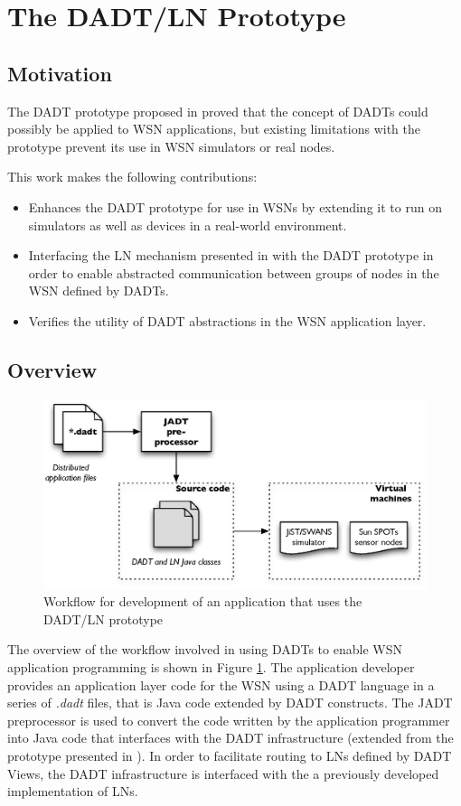 \section{The DADT/LN Prototype}

\subsection{Motivation}

The DADT prototype proposed in \cite{migliavacca_DADT:2006} proved that the
concept of DADTs could possibly be applied to WSN
applications, but existing limitations with the prototype prevent its use in WSN simulators or real nodes.

This work makes the following contributions:

\begin{itemize}
  \item Enhances the DADT prototype for use in WSNs by extending it to run
  on simulators as well as devices in a real-world environment.
  \item Interfacing the LN mechanism presented in \cite{mottola_LNAbstraction} with the DADT prototype in order
  to enable abstracted communication between groups of nodes in the WSN defined
  by DADTs.
  \item  Verifies the utility of DADT abstractions in the WSN
  application layer.
\end{itemize}

\subsection{Overview}
\begin{figure}
\centering
\includegraphics[width=\textwidth]{img/DADTLN_workflow.eps} 
\caption[DADT/LN application workflow]{Workflow for development of an application that uses
the DADT/LN prototype}
\label{Fig:DADTLN_workflow}
\end{figure} 
The overview of the workflow involved in using DADTs to enable WSN application
programming is shown in Figure \ref{Fig:DADTLN_workflow}. The application
developer provides an application layer code for the WSN using a DADT
language in a series of \emph{.dadt} files, that is Java code extended by DADT
constructs. The JADT preprocessor is used to convert the code written by the
application programmer into Java code that interfaces with the DADT infrastructure (extended from the prototype presented in \cite{migliavacca_DADT:2006}). In order to facilitate routing to LNs defined by DADT Views, the DADT infrastructure is interfaced with the a
previously developed implementation of LNs. 

